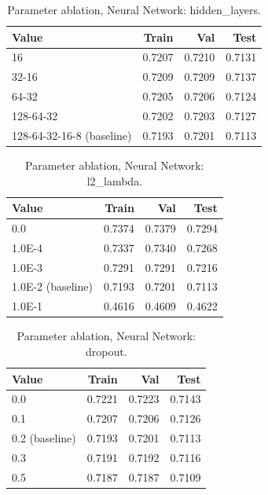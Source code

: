 
\begin{table}[ht]
\centering
\small
\caption{Parameter ablation, Neural Network: hidden\_layers.}
\label{tab:ablation-neural-hidden-layers}
\begin{tabular}{lrrr}
\toprule
Value & Train & Val & Test \\
\midrule
16 & 0.7207 & 0.7210 & 0.7131 \\
32-16 & 0.7209 & 0.7209 & 0.7137 \\
64-32 & 0.7205 & 0.7206 & 0.7124 \\
128-64-32 & 0.7202 & 0.7203 & 0.7127 \\
128-64-32-16-8 (baseline) & 0.7193 & 0.7201 & 0.7113 \\
\bottomrule
\end{tabular}
\end{table}

\begin{table}[ht]
\centering
\small
\caption{Parameter ablation, Neural Network: l2\_lambda.}
\label{tab:ablation-neural-l2-lambda}
\begin{tabular}{lrrr}
\toprule
Value & Train & Val & Test \\
\midrule
0.0 & 0.7374 & 0.7379 & 0.7294 \\
1.0E-4 & 0.7337 & 0.7340 & 0.7268 \\
1.0E-3 & 0.7291 & 0.7291 & 0.7216 \\
1.0E-2 (baseline) & 0.7193 & 0.7201 & 0.7113 \\
1.0E-1 & 0.4616 & 0.4609 & 0.4622 \\
\bottomrule
\end{tabular}
\end{table}

\begin{table}[ht]
\centering
\small
\caption{Parameter ablation, Neural Network: dropout.}
\label{tab:ablation-neural-dropout}
\begin{tabular}{lrrr}
\toprule
Value & Train & Val & Test \\
\midrule
0.0 & 0.7221 & 0.7223 & 0.7143 \\
0.1 & 0.7207 & 0.7206 & 0.7126 \\
0.2 (baseline) & 0.7193 & 0.7201 & 0.7113 \\
0.3 & 0.7191 & 0.7192 & 0.7116 \\
0.5 & 0.7187 & 0.7187 & 0.7109 \\
\bottomrule
\end{tabular}
\end{table}

